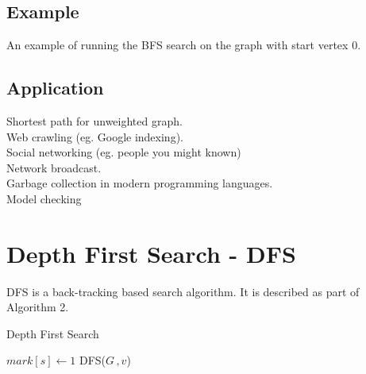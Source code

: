 \documentclass{article}
\theoremstyle{definition}
\theoremstyle{remark}
\theoremstyle{plain}
\begin{document}
\subsection{Example}

An example of running the BFS search on the graph with start vertex $0$.\\



\subsection{Application}
Shortest path for unweighted graph.\\
Web crawling (eg. Google indexing).\\
Social networking (eg. people you might known)\\
Network broadcast.\\
Garbage collection in modern programming languages.\\
Model checking\\


\section{Depth First Search - DFS}

DFS is a back-tracking based search algorithm.  It is described as part of Algorithm 2.

\begin{algorithm}
\caption{Depth First Search}\label{Depth first search for graph $G$}
\begin{algorithmic}[1]
	\State $mark[s] \gets 1$
			\State DFS($G\,,v$)
		\EndIf			
	\EndFor
\EndProcedure{}
\end{algorithmic}
\end{algorithm}
\end{document}
